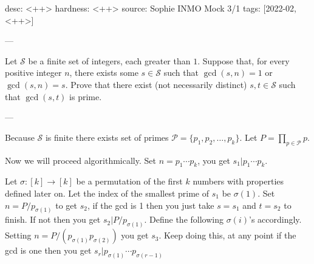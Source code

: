 desc: <++>
hardness: <++>
source: Sophie INMO Mock 3/1
tags: [2022-02, <++>]

---

Let $\mathcal{S}$ be a finite set of integers, each greater than $1$.
Suppose that, for every positive integer $n$, there exists some $s \in
\mathcal{S}$ such that $\gcd(s,n) = 1$ or $\gcd(s,n) = s$. Prove that
there exist (not necessarily distinct) $s,t \in \mathcal{S}$ such that
$\gcd(s,t)$ is prime.

---

Because $\mathcal{S}$ is finite there exists set of primes $\mathcal{P}
= \{p_1, p_2, \dots, p_k\}$. Let $P = \prod_{p \in \mathcal{P}} p$. 

Now we will proceed algorithmically. Set $n = p_1\cdots p_k$, you get $s_1 |
p_1 \cdots p_k$. 

Let $\sigma:[k] \to [k]$ be a permutation of the first
$k$ numbers with properties defined later on. Let the index of 
the smallest prime of $s_1$ be $\sigma(1)$. Set $n = P/p_{\sigma(1)}$ to
get $s_2$,
if the gcd is 1 then you just take $s = s_1$ and $t = s_2$ to finish. If
not then you get $s_2 | P/p_{\sigma(1)}$. Define the following
$\sigma(i)$'s accordingly. Setting $n =
P/(p_{\sigma(1)} p_{\sigma(2)})$ you get $s_3$. Keep doing this, at any point
if the gcd is one then you get $s_r | p_{\sigma(1)} \cdots p_{\sigma(r-1)}$
